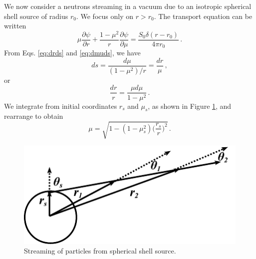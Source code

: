 We now consider a neutrons streaming in a vacuum due to an isotropic spherical shell source of radius $r_0$.  We focus only on $r > r_0$.  The transport equation can be written
\begin{equation}
 \mu \frac{\partial \psi}{\partial r} + \frac{1-\mu^2}{r} \frac{\partial \psi}{\partial \mu} = \frac{S_0\delta(r-r_0)}{4\pi r_0} \, .
\end{equation}
From Eqs. \ref{eq:drds} and \ref{eq:dmuds}, we have
\begin{equation}
 ds = \frac{d\mu}{ (1-\mu^2)/r } = \frac{dr}{\mu} \, ,
\end{equation}
or
\begin{equation}
 \frac{dr}{r} = \frac{\mu d\mu}{1-\mu^2} \, .
\end{equation}
We integrate from initial coordinates $r_s$ and $\mu_s$, as shown in Figure \ref{fig:sphere_example}, and rearrange to obtain
\begin{equation}
 \mu = \sqrt{ 1 - (1-\mu^2_s)\Big (\frac{r_s}{r} \Big )^2  } \, .
 \label{eq:angularrestribution}
\end{equation}
\begin{figure}[ht] 
    \centering
    \includegraphics[keepaspectratio, width = 2.5 in]{sphere_example}
    \caption{Streaming of particles from spherical shell source.}
    \label{fig:sphere_example}
\end{figure}

